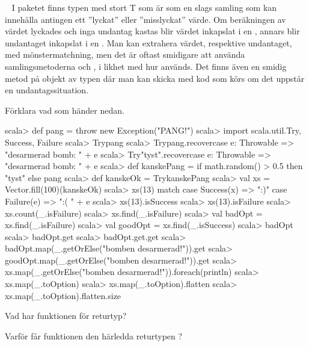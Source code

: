 \QUESTEND











\QUESTBEGIN

\Task  \what~  I paketet  finns typen  med stort T som är som en slags samling som kan innehålla antingen ett ''lyckat'' eller ''misslyckat'' värde. Om beräkningen av värdet lyckades och inga undantag kastas blir värdet inkapslat i en , annars blir undantaget inkapslat i en . Man kan extrahera värdet, respektive undantaget, med mönstermatchning, men det är oftast smidigare att använda samlingsmetoderna  och , i likhet med hur  används. Det finns även en smidig metod  på objekt av typen  där man kan skicka med kod som körs om det uppstår en undantagssituation.

\Subtask Förklara vad som händer nedan.
\begin{REPL}
scala> def pang = throw new Exception("PANG!")
scala> import scala.util.{Try, Success, Failure}
scala> Try{pang}
scala> Try{pang}.recover{case e: Throwable =>   "desarmerad bomb: " + e}
scala> Try{"tyst"}.recover{case e: Throwable => "desarmerad bomb: " + e}
scala> def kanskePang = if math.random() > 0.5 then "tyst" else pang
scala> def kanskeOk = Try{kanskePang}
scala> val xs = Vector.fill(100)(kanskeOk)
scala> xs(13) match
         case Success(x) => ":)"
         case Failure(e) => ":( " + e
scala> xs(13).isSuccess
scala> xs(13).isFailure
scala> xs.count(_.isFailure)
scala> xs.find(_.isFailure)
scala> val badOpt = xs.find(_.isFailure)
scala> val goodOpt = xs.find(_.isSuccess)
scala> badOpt
scala> badOpt.get
scala> badOpt.get.get
scala> badOpt.map(_.getOrElse("bomben desarmerad!")).get
scala> goodOpt.map(_.getOrElse("bomben desarmerad!")).get
scala> xs.map(_.getOrElse("bomben desarmerad!")).foreach(println)
scala> xs.map(_.toOption)
scala> xs.map(_.toOption).flatten
scala> xs.map(_.toOption).flatten.size
\end{REPL}


\Subtask Vad har funktionen  för returtyp?

\Subtask Varför får funktionen  den härledda returtypen ?

\SOLUTION


\TaskSolved \what


